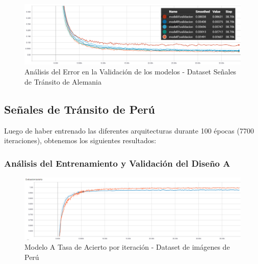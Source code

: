 			\begin{figure}[H]
				\includegraphics[width=1\textwidth, height=\textheight,keepaspectratio]{images/desarrollo/trainResults/germanSummary_validError} 
				\begin{center}
				\caption{\small{Análisis del Error en la Validación de los modelos - Dataset Señales de Tránsito de Alemania}}
				
				{\small{\fontsize{10}{16.8}\selectfont {Fuente: Elaboración propia}}}
				\end{center}
				\vspace{-1.5em}
			\end{figure}
	









	\newpage
	\subsection{Señales de Tránsito de Perú}
		Luego de haber entrenado las diferentes arquitecturas durante 100 épocas (7700 iteraciones), obtenemos los siguientes resultados:

		\subsubsection{Análisis del Entrenamiento y Validación del Diseño A}  
			\begin{figure}[H]
				\begin{center}
				\includegraphics[width=1\textwidth]{images/desarrollo/trainResults/peru/model0Acierto} 
				\end{center}
				\begin{center}
				\caption{\small{Modelo A Tasa de Acierto por iteración - Dataset de imágenes de Perú  }}
				
				{\small{\fontsize{10}{16.8}\selectfont {Fuente: Elaboración propia}}}
				\end{center}
				\vspace{-1.5em}
			\end{figure}

